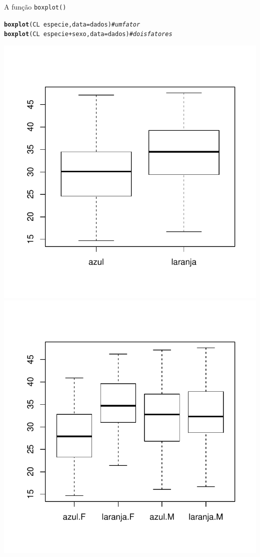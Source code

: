 \documentclass[10pt]{beamer}\usepackage[]{graphicx}\usepackage[]{color}
\makeatletter
\newcommand{\hlcom}[1]{\textcolor[rgb]{0.498,0.498,0.498}{\textit{#1}}}%
\newcommand{\hlopt}[1]{\textcolor[rgb]{0,0,0}{#1}}%
\newcommand{\hlstd}[1]{\textcolor[rgb]{0.345,0.345,0.345}{#1}}%
\newcommand{\hlkwc}[1]{\textcolor[rgb]{0.333,0.667,0.333}{#1}}%
\newcommand{\hlkwd}[1]{\textcolor[rgb]{0.282,0.239,0.545}{\textbf{#1}}}%
\newenvironment{kframe}{%
 \def\at@end@of@kframe{}%
 \ifinner\ifhmode%
  \def\at@end@of@kframe{\end{minipage}}%
  \begin{minipage}{\columnwidth}%
 \fi\fi%
 \def\FrameCommand##1{\hskip\@totalleftmargin \hskip-\fboxsep
 \colorbox{shadecolor}{##1}\hskip-\fboxsep
     \hskip-\linewidth \hskip-\@totalleftmargin \hskip\columnwidth}%
 \MakeFramed {\advance\hsize-\width
   \@totalleftmargin\z@ \linewidth\hsize
   \@setminipage}}%
 {\par\unskip\endMakeFramed%
 \at@end@of@kframe}
\newenvironment{knitrout}{}{} %
\makeatother
\begin{document}
\begin{frame}[fragile]{A função \texttt{boxplot()}}
\begin{knitrout}\small
{}\color{fgcolor}\begin{kframe}
\begin{alltt}
\hlkwd{boxplot}\hlstd{(CL} \hlopt{~} \hlstd{especie,} \hlkwc{data} \hlstd{= dados)}        \hlcom{# um fator}
\hlkwd{boxplot}\hlstd{(CL} \hlopt{~} \hlstd{especie} \hlopt{+} \hlstd{sexo,} \hlkwc{data} \hlstd{= dados)} \hlcom{# dois fatores}
\end{alltt}
\end{kframe}

{\centering \includegraphics[width=.49\textwidth]{figure/unnamed-chunk-291} 
\includegraphics[width=.49\textwidth]{figure/unnamed-chunk-292} 

}



\end{knitrout}

\end{frame}
\end{document}
